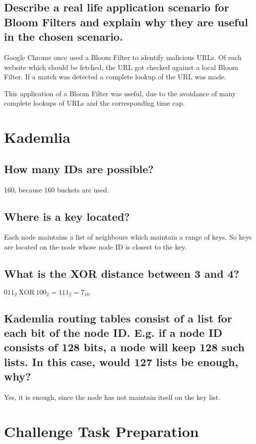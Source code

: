 \documentclass{article}
\begin{document}
\subsection{Describe a real life application scenario for Bloom
Filters and explain why they are useful in the chosen scenario.}

  Google Chrome once used a Bloom Filter to identify malicious URLs. Of each
  website which should be fetched, the URL got checked against a local Bloom Filter.
  If a match was detected a complete lookup of the URL was made.

  This application of a Bloom Filter was useful, due to the avoidance of
  many complete lookups of URLs and the corresponding time cap.


\section{Kademlia}

\subsection{How many IDs are possible?}

  160, because 160 buckets are used.

\subsection{Where is a key located?}

  Each node maintains a list of neighbours which maintain a range of keys.
  So keys are located on the node whose node ID is closest to the key.

\subsection{What is the XOR distance between 3 and 4?}

  ${011}_2\ \text{XOR}\ {100}_2 = {111}_2 = 7_{10}$

\subsection{Kademlia routing tables consist of a list for each bit of the node ID. E.g. if
a node ID consists of 128 bits, a node will keep 128 such lists. In this case, would 127
lists be enough, why?}

  Yes, it is enough, since the node has not maintain itself on the key list.

\section{Challenge Task Preparation}



\end{document}
